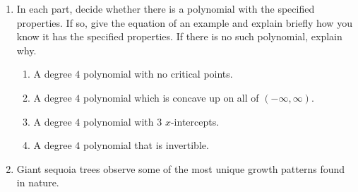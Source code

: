 \documentclass{article}
\begin{document}
\begin{enumerate}
\newpage

 \item In each part, decide whether there is a polynomial with the specified properties. If so, give the equation
of an example and explain briefly how you know it has the specified properties. If there is no such
polynomial, explain why.
\begin{enumerate}
   \item \begin{problem}[\vfill] A degree $4$ polynomial with no critical points.
   \end{problem}
    \item \begin{problem}[\vfill]A degree $4$ polynomial which is concave up on all of $(-\infty, \infty)$.
    \end{problem}
    \item \begin{problem}[\vfill]A degree $4$ polynomial with $3$ $x$-intercepts.
    \end{problem}
    \item \begin{problem}[\vfill]A degree $4$ polynomial that is invertible.
    \end{problem}
    
\end{enumerate}
\newpage

 \item Giant sequoia trees observe some of the most unique growth patterns found in nature. 
  \begin{enumerate}
        

\end{enumerate}
\end{enumerate}
\end{document}

